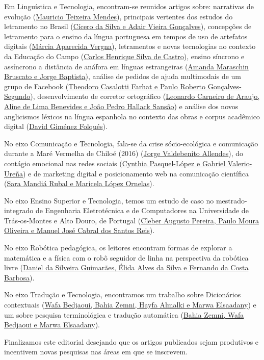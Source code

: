\documentclass{textolivre-html}
\begin{document}
Em Linguística e Tecnologia, encontram-se reunidos artigos sobre: narrativas de evolução (\href{https://doi.org/10.35699/1983-3652.2021.26711}{Mauricio Teixeira Mendes}), principais vertentes dos estudos do letramento no Brasil (\href{https://doi.org/10.35699/1983-3652.2021.29164}{Cícero da Silva e Adair Vieira Gonçalves}), concepções de letramento para o ensino da língua portuguesa em tempos de uso de artefatos digitais (\href{https://doi.org/10.35699/1983-3652.2021.24366}{Márcia Aparecida Vergna}), letramentos e novas tecnologias no contexto da Educação do Campo (\href{https://doi.org/10.35699/1983-3652.2021.26765}{Carlos Henrique Silva de Castro}), ensino síncrono e assíncrono a distância de anáfora em línguas estrangeiras (\href{https://doi.org/10.35699/1983-3652.2021.29177}{Amanda Maraschin Bruscato e Jorge Baptista}), análise de pedidos de ajuda multimodais de um grupo de Facebook (\href{https://doi.org/10.35699/1983-3652.2021.24391}{Theodoro Casalotti Farhat e Paulo Roberto Gonçalves-Segundo}), desenvolvimento de corretor ortográfico (\href{https://doi.org/10.35699/1983-3652.2021.26469}{Leonardo Carneiro de Araujo, Aline de Lima Benevides e João Pedro Hallack Sansão}) e análise dos novos anglicismos léxicos na língua espanhola no contexto das obras e corpus acadêmico digital (\href{https://doi.org/10.35699/1983-3652.2021.24418}{David Giménez Folqués}).

No eixo Comunicação e Tecnologia, fala-se da crise sócio-ecológica e comunicação durante a Maré Vermelha de Chiloé (2016) (\href{https://doi.org/10.35699/1983-3652.2021.26231}{Jorge Valdebenito Allendes}), do contágio emocional nas redes sociais (\href{https://doi.org/10.35699/1983-3652.2021.29080}{Cynthia Pasquel-López e Gabriel Valerio-Ureña}) e de marketing digital e posicionamento web na comunicação científica (\href{	https://doi.org/10.35699/1983-3652.2021.26251}{Sara Mandiá Rubal e Maricela López Ornelas}).

No eixo Ensino Superior e Tecnologia, temos um estudo de caso no mestrado-integrado de Engenharia Eletrotécnica e de Computadores na Universidade de Trás-os-Montes e Alto Douro, de Portugal (\href{https://doi.org/10.35699/1983-3652.2021.26709}{Cleber Augusto Pereira, Paulo Moura Oliveira e Manuel José Cabral dos Santos Reis}).
	
No eixo Robótica pedagógica, os leitores encontram formas de explorar a matemática e a física com o robô seguidor de linha na perspectiva da robótica livre (\href{https://doi.org/10.35699/1983-3652.2021.24895}{Daniel da Silveira Guimarães, Élida Alves da Silva e Fernando da Costa Barbosa}).

No eixo Tradução e Tecnologia, encontramos um trabalho sobre Dicionários contextuais (\href{https://doi.org/10.35699/1983-3652.2021.26501}{Wafa Bedjaoui, Bahia Zemni, Hayfa Almalki e Marwa Elsaadany}) e um sobre pesquisa terminológica e tradução automática (\href{https://doi.org/10.35699/1983-3652.2021.26501}{Bahia Zemni, Wafa Bedjaoui e Marwa Elsaadany}).
	
Finalizamos este editorial desejando que os artigos publicados sejam produtivos e incentivem novas pesquisas nas áreas em que se inscrevem.
\end{document}
